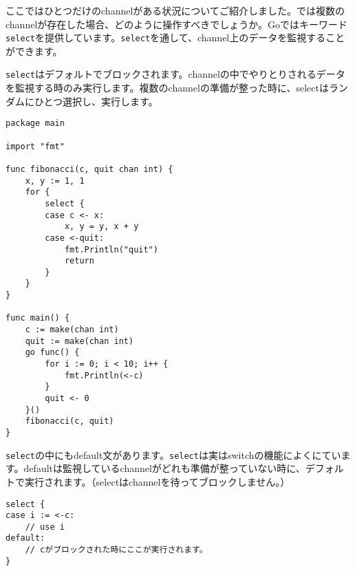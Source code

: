 ここではひとつだけのchannelがある状況についてご紹介しました。では複数のchannelが存在した場合、どのように操作すべきでしょうか。Goではキーワード\texttt{select}を提供しています。\texttt{select}を通して、channel上のデータを監視することができます。

\texttt{select}はデフォルトでブロックされます。channelの中でやりとりされるデータを監視する時のみ実行します。複数のchannelの準備が整った時に、selectはランダムにひとつ選択し、実行します。

\begin{lstlisting}[numbers=none]
package main

import "fmt"

func fibonacci(c, quit chan int) {
    x, y := 1, 1
    for {
        select {
        case c <- x:
            x, y = y, x + y
        case <-quit:
            fmt.Println("quit")
            return
        }
    }
}

func main() {
    c := make(chan int)
    quit := make(chan int)
    go func() {
        for i := 0; i < 10; i++ {
            fmt.Println(<-c)
        }
        quit <- 0
    }()
    fibonacci(c, quit)
}
\end{lstlisting}

\texttt{select}の中にもdefault文があります。\texttt{select}は実はswitchの機能によくにています。defaultは監視しているchannelがどれも準備が整っていない時に、デフォルトで実行されます。（selectはchannelを待ってブロックしません。）

\begin{lstlisting}[numbers=none]
select {
case i := <-c:
    // use i
default:
    // cがブロックされた時にここが実行されます。
}
\end{lstlisting}

